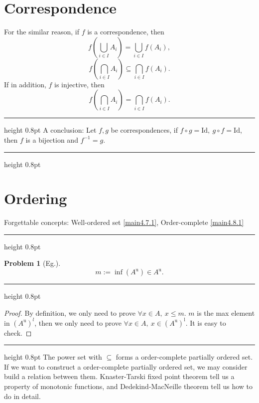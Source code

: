 \documentclass{article}
\newcommand{\singleline}{\hrule height 0.8pt}
\theoremstyle{1}
\newtheorem{problem}{Problem}[section]
\begin{document}
\section{Correspondence}
For the similar reason, if $f$ is a correspondence, then
\begin{equation}
    f\left(\bigcup_{i\in I}A_i \right)=\bigcup_{i\in I}f\left(A_i\right),
\end{equation}
\begin{equation}
    f\left(\bigcap_{i\in I}A_i \right)\subseteq\bigcap_{i\in I}f\left(A_i\right).
\end{equation}
If in addition, $f$ is injective, then
\begin{equation}
    f\left(\bigcap_{i\in I}A_i \right)=\bigcap_{i\in I}f\left(A_i\right).
\end{equation}
\singleline
A conclusion: Let $f,g$ be correspondences, if $f\circ g=\mathrm{Id},\ g\circ f=\mathrm{Id}$, then $f$ is a bijection and $f^{-1}=g$.
\singleline

\section{Ordering}
Forgettable concepts: Well-ordered set \ref{main4.7.1}, Order-complete \ref{main4.8.1}
\singleline
\begin{problem}[Eg.]
$$m:=\inf(A^\mathrm{u})\in A^\mathrm{u}.$$
\end{problem}
\singleline
\begin{proof}
    
 By definition, we only need to prove $\forall x\in A, \ x\le m$. $m$ is the max element in $\left(A^\mathrm{u}\right)^l$, then we only need to prove $\forall x\in A,\ x\in \left(A^\mathrm{u}\right)^\mathrm{l}$. It is easy to check.

\end{proof}
\singleline
The power set with $\subseteq$ forms a order-complete partially ordered set. If we want to construct a order-complete partially ordered set, we may consider build a relation between them. Knaster-Tarski fixed point theorem tell us a property of monotonic functions,  and Dedekind-MacNeille theorem tell us how to do in detail.
\end{document}
